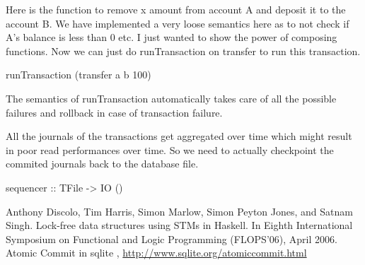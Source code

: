 \documentclass[11pt,a4paper]{article}
\begin{document}
Here is the function to remove x amount from account A and deposit it to
the account B. We have implemented a very loose semantics here as to not
check if A's balance is less than 0 etc. I just wanted to show the power
of composing functions. Now we can just do runTransaction on transfer to
run this transaction. \\
\begin{code}
runTransaction (transfer a b 100)
\end{code}
The semantics of runTransaction automatically
takes care of all the possible failures and rollback in case of
transaction failure.

All the journals of the transactions get aggregated over time which might result in poor read performances over time. So we need to actually checkpoint the commited journals back to the database file. \\
\begin{code}
sequencer :: TFile -> IO () 
\end{code}





\begin{thebibliography}{10}
Anthony Discolo, Tim Harris, Simon Marlow, Simon Peyton Jones, and Satnam Singh. Lock-free data structures using STMs in Haskell. In Eighth International Symposium on Functional and Logic Programming (FLOPS’06), April 2006.
Atomic Commit in sqlite , \url{http://www.sqlite.org/atomiccommit.html}



\end{thebibliography}
\end{document}
